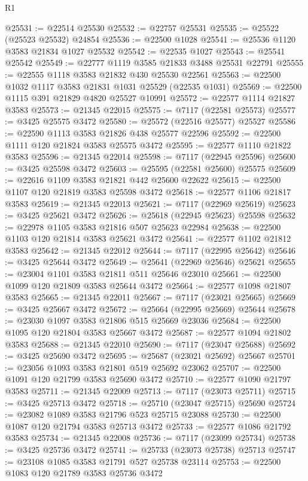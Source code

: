 \begin{lexlean}{R1}
\begin{coremodule}
@25531 := @22514 @25530
@25532 := @22757 @25531
@25535 := @25522 (@25523 @25532) @24854
@25536 := @22500 @1028
@25541 := @25536 @1120 @3583 @21834 @1027 @25532
@25542 := @22535 @1027
@25543 := @25541 @25542
@25549 := @22777 @1119 @3585 @21833 @3488 @25531 @22791
@25555 := @22555 @1118 @3583 @21832 @430 @25530 @22561
@25563 := @22500 @1032 @1117 @3583 @21831 @1031 @25529 (@22535 @1031)
@25569 := @22500 @1115 @391 @21829 @4820 @25527 @10991
@25572 := @22577 @1114 @21827 @3583
@25573 := @21345 @22015
@25575 := @7117 (@22581 @25573)
@25577 := @3425 @25575 @3472
@25580 := @25572 (@22516 @25577) @25527
@25586 := @22590 @1113 @3583 @21826 @438 @25577 @22596
@25592 := @22500 @1111 @120 @21824 @3583 @25575 @3472
@25595 := @22577 @1110 @21822 @3583
@25596 := @21345 @22014
@25598 := @7117 (@22945 @25596)
@25600 := @3425 @25598 @3472
@25603 := @25595 (@22581 @25600) @25575
@25609 := @22616 @1109 @3583 @21821 @442 @25600 @22622
@25615 := @22500 @1107 @120 @21819 @3583 @25598 @3472
@25618 := @22577 @1106 @21817 @3583
@25619 := @21345 @22013
@25621 := @7117 (@22969 @25619)
@25623 := @3425 @25621 @3472
@25626 := @25618 (@22945 @25623) @25598
@25632 := @22978 @1105 @3583 @21816 @507 @25623 @22984
@25638 := @22500 @1103 @120 @21814 @3583 @25621 @3472
@25641 := @22577 @1102 @21812 @3583
@25642 := @21345 @22012
@25644 := @7117 (@22995 @25642)
@25646 := @3425 @25644 @3472
@25649 := @25641 (@22969 @25646) @25621
@25655 := @23004 @1101 @3583 @21811 @511 @25646 @23010
@25661 := @22500 @1099 @120 @21809 @3583 @25644 @3472
@25664 := @22577 @1098 @21807 @3583
@25665 := @21345 @22011
@25667 := @7117 (@23021 @25665)
@25669 := @3425 @25667 @3472
@25672 := @25664 (@22995 @25669) @25644
@25678 := @23030 @1097 @3583 @21806 @515 @25669 @23036
@25684 := @22500 @1095 @120 @21804 @3583 @25667 @3472
@25687 := @22577 @1094 @21802 @3583
@25688 := @21345 @22010
@25690 := @7117 (@23047 @25688)
@25692 := @3425 @25690 @3472
@25695 := @25687 (@23021 @25692) @25667
@25701 := @23056 @1093 @3583 @21801 @519 @25692 @23062
@25707 := @22500 @1091 @120 @21799 @3583 @25690 @3472
@25710 := @22577 @1090 @21797 @3583
@25711 := @21345 @22009
@25713 := @7117 (@23073 @25711)
@25715 := @3425 @25713 @3472
@25718 := @25710 (@23047 @25715) @25690
@25724 := @23082 @1089 @3583 @21796 @523 @25715 @23088
@25730 := @22500 @1087 @120 @21794 @3583 @25713 @3472
@25733 := @22577 @1086 @21792 @3583
@25734 := @21345 @22008
@25736 := @7117 (@23099 @25734)
@25738 := @3425 @25736 @3472
@25741 := @25733 (@23073 @25738) @25713
@25747 := @23108 @1085 @3583 @21791 @527 @25738 @23114
@25753 := @22500 @1083 @120 @21789 @3583 @25736 @3472

\end{coremodule}
\end{lexlean}
